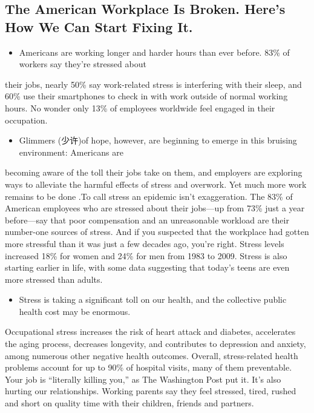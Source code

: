 \documentclass[UTF8,11pt]{ctexart}
\begin{document}
\subsection*{\textbf{The American Workplace Is Broken. Here’s How We Can Start Fixing It.}}


\begin{itemize}[leftmargin=2em,itemsep=.2em,topsep=.4em]\item[A.] Americans are working longer and harder hours than ever before. 83\% of workers say they’re stressed about
\end{itemize}

their jobs, nearly 50\% say work-related stress is interfering with their sleep, and 60\% use their smartphones to check in with work outside of normal working hours. No wonder only 13\% of employees worldwide feel engaged in their occupation.


\begin{itemize}[leftmargin=2em,itemsep=.2em,topsep=.4em]\item[B.] Glimmers (少许)of hope, however, are beginning to emerge in this bruising environment: Americans are
\end{itemize}

becoming aware of the toll their jobs take on them, and employers are exploring ways to alleviate the harmful effects of stress and overwork. Yet much more work remains to be done .To call stress an epidemic isn’t exaggeration. The 83\% of American employees who are stressed about their jobs---up from 73\% just a year before—say that poor compensation and an unreasonable workload are their number-one sources of stress. And if you suspected that the workplace had gotten more stressful than it was just a few decades ago, you’re right. Stress levels increased 18\% for women and 24\% for men from 1983 to 2009. Stress is also starting earlier in life, with some data suggesting that today’s teens are even more stressed than adults.


\begin{itemize}[leftmargin=2em,itemsep=.2em,topsep=.4em]\item[C.] Stress is taking a significant toll on our health, and the collective public health cost may be enormous.
\end{itemize}

Occupational stress increases the risk of heart attack and diabetes, accelerates the aging process, decreases longevity, and contributes to depression and anxiety, among numerous other negative health outcomes. Overall, stress-related health problems account for up to 90\% of hospital visits, many of them preventable. Your job is “literally killing you,” as The Washington Post put it. It’s also hurting our relationships. Working parents say they feel stressed, tired, rushed and short on quality time with their children, friends and partners.
\end{document}
